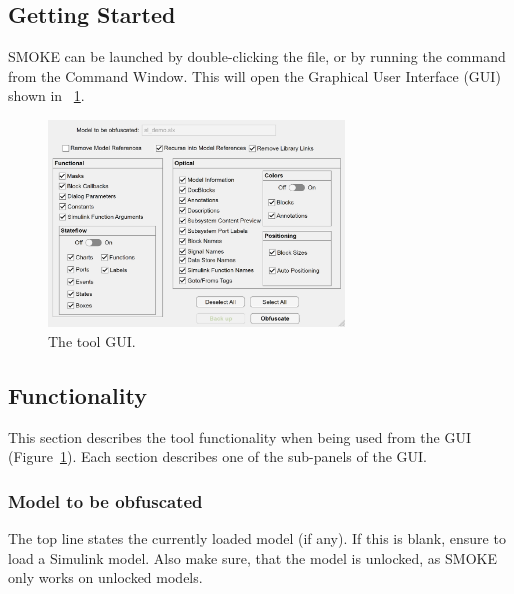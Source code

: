 \documentclass{article}
\makeatletter
\newcommand{\toolname}{SMOKE\@\xspace}
\makeatother
\begin{document}
\subsection{Getting Started}
\toolname can be launched by double-clicking the  file, or by running the command  from the Command Window. This will open the Graphical User Interface (GUI) shown in \figurename~\ref{fig:contextMenu}.

\begin{figure}[htb!]
	\centering
	\includegraphics[width=0.7\textwidth]{../figs/GUI}
	\caption{The tool GUI.}
	\label{fig:contextMenu}
\end{figure}

\newpage
\subsection{Functionality}
This section describes the tool functionality when being used from the GUI (Figure~\ref{fig:contextMenu}). Each section describes one of the sub-panels of the GUI.

\subsubsection{Model to be obfuscated}
The top line states the currently loaded model (if any). If this is blank, ensure to load a Simulink model. Also make sure, that the model is unlocked, as \toolname only works on unlocked models.
\end{document}
